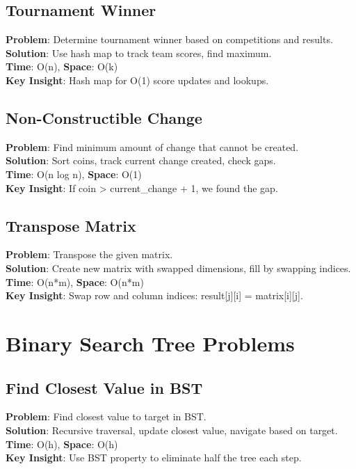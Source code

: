 \documentclass{report}
\begin{document}
\subsection{Tournament Winner}
\textbf{Problem}: Determine tournament winner based on competitions and results.\\
\textbf{Solution}: Use hash map to track team scores, find maximum.\\
\textbf{Time}: O(n), \textbf{Space}: O(k)\\
\textbf{Key Insight}: Hash map for O(1) score updates and lookups.

\subsection{Non-Constructible Change}
\textbf{Problem}: Find minimum amount of change that cannot be created.\\
\textbf{Solution}: Sort coins, track current change created, check gaps.\\
\textbf{Time}: O(n log n), \textbf{Space}: O(1)\\
\textbf{Key Insight}: If coin > current\_change + 1, we found the gap.

\subsection{Transpose Matrix}
\textbf{Problem}: Transpose the given matrix.\\
\textbf{Solution}: Create new matrix with swapped dimensions, fill by swapping indices.\\
\textbf{Time}: O(n*m), \textbf{Space}: O(n*m)\\
\textbf{Key Insight}: Swap row and column indices: result[j][i] = matrix[i][j].

\section{Binary Search Tree Problems}

\subsection{Find Closest Value in BST}
\textbf{Problem}: Find closest value to target in BST.\\
\textbf{Solution}: Recursive traversal, update closest value, navigate based on target.\\
\textbf{Time}: O(h), \textbf{Space}: O(h)\\
\textbf{Key Insight}: Use BST property to eliminate half the tree each step.
\end{document}
